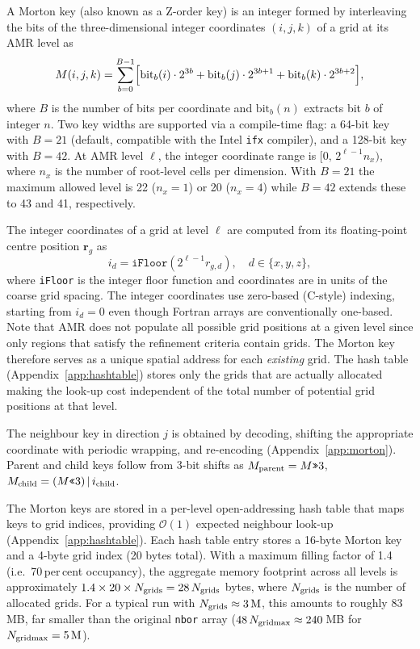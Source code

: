 \documentclass[fleqn,usenatbib]{mnras}
\newcommand{\ngridmax}{N_{\rm gridmax}}
\newcommand{\Olog}[1]{\mathcal{O}(#1)}
\newcommand{\code}[1]{\texttt{#1}}
\begin{document}
A Morton key (also known as a Z-order key) \citep{Morton1966,Samet2006} is an integer formed
by interleaving the bits of the three-dimensional integer coordinates
$(i, j, k)$ of a grid at its AMR level as
\begin{equation}
M(i, j, k) = \sum_{b=0}^{B-1}
\Bigl[
  \text{bit}_b(i) \cdot 2^{3b} +
  \text{bit}_b(j) \cdot 2^{3b+1} +
  \text{bit}_b(k) \cdot 2^{3b+2}
\Bigr],
\label{eq:morton_encode}
\end{equation}
where $B$ is the number of bits per coordinate and $\text{bit}_b(n)$
extracts bit $b$ of integer $n$.
Two key widths are supported via a compile-time flag:
a 64-bit key with $B = 21$ (default, compatible with the Intel \texttt{ifx}
compiler), and a 128-bit key with $B = 42$.
At AMR level $\ell$, the integer coordinate range is $\texttt{[}0,\, 
2^{\ell-1}n_x\texttt{)}$, where $n_x$ is the number of root-level cells per dimension.
With $B = 21$ the maximum allowed level is 22 ($n_x = 1$) or 20 ($n_x = 4$) while
$B = 42$ extends these to 43 and 41, respectively.

The integer coordinates of a grid at level $\ell$ are computed from its
floating-point centre position $\mathbf{r}_g$ as
\begin{equation}
i_d = \texttt{iFloor}( 2^{\ell-1}r_{g,d} ), \quad d \in \{x, y, z\},
\label{eq:grid_to_int}
\end{equation}
where \texttt{iFloor} is the integer floor function and coordinates are in units of the coarse grid spacing.
The integer coordinates use zero-based (C-style) indexing,
starting from $i_d = 0$ even though Fortran arrays are
conventionally one-based.
Note that AMR does not populate all possible grid positions at a given
level since only regions that satisfy the refinement criteria contain grids.
The Morton key therefore serves as a unique spatial address for each
\emph{existing} grid. The hash table (Appendix~\ref{app:hashtable})
stores only the grids that are actually allocated making the
look-up cost independent of the total number of potential grid
positions at that level.

The neighbour key in direction $j$ is obtained by decoding, shifting
the appropriate coordinate with periodic wrapping, and re-encoding
(Appendix~\ref{app:morton}).  Parent and child keys follow from
3-bit shifts as $M_{\rm parent} = M \text{\texttt{>>}} 3$, $M_{\rm child} =
(M \text{\texttt{<<}} 3) \,|\, i_{\rm child}$.


The Morton keys are stored in a per-level open-addressing hash table
that maps keys to grid indices, providing $\Olog{1}$ expected
neighbour look-up (Appendix~\ref{app:hashtable}).
Each hash table entry stores a 16-byte Morton key and a 4-byte grid
index (20 bytes total).  With a maximum filling factor of 1.4 (i.e.\ 70\,per\,cent occupancy), the
aggregate memory footprint across all levels is approximately
$1.4 \times 20 \times N_{\rm grids} = 28\,N_{\rm grids}$ bytes,
where $N_{\rm grids}$ is the number of allocated grids.
For a typical run with $N_{\rm grids} \approx 3\,\mathrm{M}$, this
amounts to roughly 83\,MB, far smaller than the original
\code{nbor} array ($48\,\ngridmax \approx 240$\,MB for
$\ngridmax = 5\,\mathrm{M}$).
\end{document}
